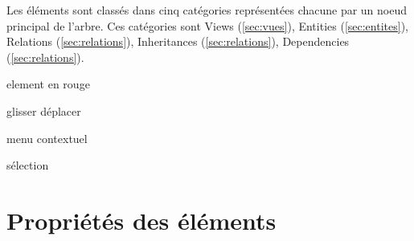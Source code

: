Les éléments sont classés dans cinq catégories représentées chacune par un noeud principal de l'arbre. Ces catégories sont Views (\ref{sec:vues}), Entities (\ref{sec:entites}), Relations (\ref{sec:relations}), Inheritances (\ref{sec:relations}), Dependencies (\ref{sec:relations}).

element en rouge

glisser déplacer

menu contextuel

sélection


\section{Propriétés des éléments}
